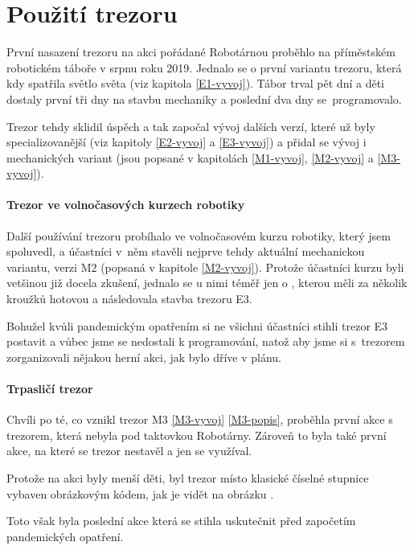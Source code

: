 
\section{Použití trezoru}
První nasazení trezoru na akci pořádané Robotárnou \parencite{robotarna} proběhlo na příměstském robotickém táboře v srpnu roku 2019.
Jednalo se o první variantu trezoru, která kdy spatřila světlo světa (viz kapitola \ref{E1-vyvoj}). Tábor trval pět dní a děti dostaly první tři dny na stavbu mechaniky a poslední dva dny 
se~programovalo. 

Trezor tehdy sklidil úspěch a tak započal vývoj dalších verzí, které už byly specializovanější (viz kapitoly \ref{E2-vyvoj} a  \ref{E3-vyvoj}) a přidal se vývoj i mechanických
variant (jsou popsané v kapitolách \ref{M1-vyvoj}, \ref{M2-vyvoj} a \ref{M3-vyvoj}).

\paragraph{Trezor ve volnočasových kurzech robotiky}
Další používání trezoru pro\-bí\-ha\-lo ve volnočasovém kurzu robotiky, který jsem spoluvedl, a účastníci v~něm stavěli nejprve tehdy aktuální mechanickou variantu, verzi M2 (popsaná v kapitole \ref{M2-vyvoj}).
Protože účastníci kurzu byli vetšinou již docela zkušení, jednalo se u nimi téměř jen o , kterou měli za několik kroužků hotovou a následovala stavba trezoru E3. 

Bohužel kvůli pandemickým opatřením si ne všichni účastníci stihli trezor E3 postavit a vůbec jsme se nedostali k programování, natož aby jsme si s~trezorem zorganizovali nějakou herní akci, 
jak bylo dříve v plánu.

\paragraph{Trpasličí trezor}
Chvíli po té, co vznikl trezor M3 \ref{M3-vyvoj} \ref{M3-popis},  proběhla první akce s trezorem, která nebyla pod taktovkou Robotárny. Zároveň to byla také 
první akce, na které se trezor nestavěl a jen se využíval.

Protože na akci byly menší děti, byl trezor místo klasické číselné stupnice  vybaven obrázkovým kódem, jak je vidět na obrázku . %

Toto však byla poslední akce která se stihla uskutečnit před započetím pandemických opatření.

